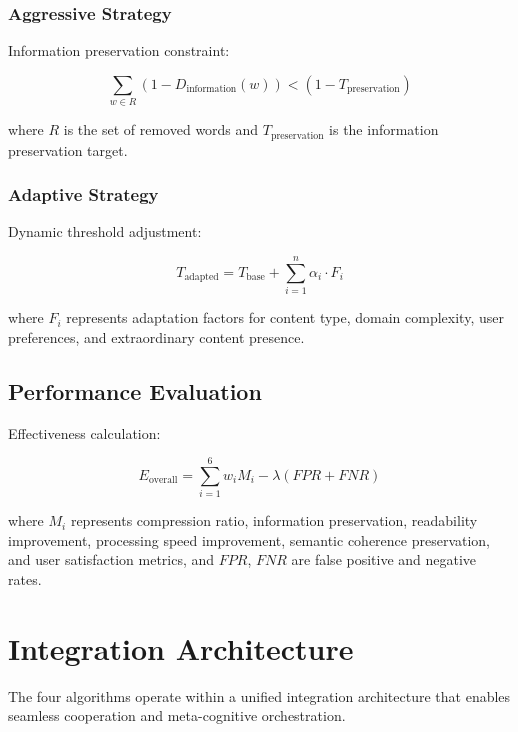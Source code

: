 \documentclass[12pt,a4paper]{article}
\begin{document}
\subsubsection{Aggressive Strategy}

Information preservation constraint:

\begin{equation}
\sum_{w \in R} (1 - D_{\text{information}}(w)) < (1 - T_{\text{preservation}})
\end{equation}

where $R$ is the set of removed words and $T_{\text{preservation}}$ is the information preservation target.

\subsubsection{Adaptive Strategy}

Dynamic threshold adjustment:

\begin{equation}
T_{\text{adapted}} = T_{\text{base}} + \sum_{i=1}^{n} \alpha_i \cdot F_i
\end{equation}

where $F_i$ represents adaptation factors for content type, domain complexity, user preferences, and extraordinary content presence.

\subsection{Performance Evaluation}

Effectiveness calculation:

\begin{equation}
E_{\text{overall}} = \sum_{i=1}^{6} w_i M_i - \lambda(FPR + FNR)
\end{equation}

where $M_i$ represents compression ratio, information preservation, readability improvement, processing speed improvement, semantic coherence preservation, and user satisfaction metrics, and $FPR$, $FNR$ are false positive and negative rates.

\section{Integration Architecture}

The four algorithms operate within a unified integration architecture that enables seamless cooperation and meta-cognitive orchestration.
\end{document}

